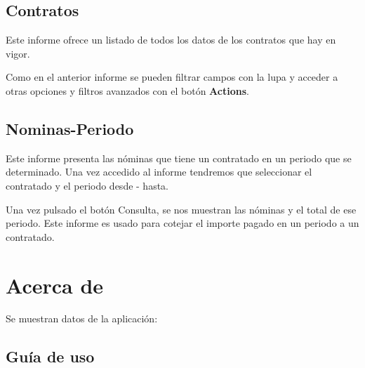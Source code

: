 \subsection{Contratos}\label{contratos-1}

Este informe ofrece un listado de todos los datos de los contratos que hay en vigor.


Como en el anterior informe se pueden filtrar campos con la lupa y acceder a otras opciones y filtros avanzados con el botón \textbf{Actions}.

\subsection{Nominas-Periodo}\label{nominas-periodo}

Este informe presenta las nóminas que tiene un contratado en un periodo que se determinado. Una vez accedido al informe tendremos que seleccionar el contratado y el periodo desde - hasta.

Una vez pulsado el botón Consulta, se nos muestran las nóminas y el total de ese periodo. Este informe es usado para cotejar el importe pagado en un periodo a un contratado.

\section{Acerca de}\label{acerca-de}

Se muestran datos de la aplicación:\\
\subsection{Guía de uso}\label{guia-de-uso}

